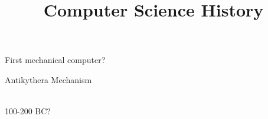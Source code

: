 \documentclass[xcolor={usenames,dvipsnames,svgnames,table},12pt]{beamer}
\title{Computer Science History}
\begin{document}

\begin{frame}
  \begin{center}
    First mechanical computer?
  \end{center}
\end{frame}

\begin{frame}{Antikythera Mechanism}
  \begin{center}
     \quad
     \\
    100-200 BC?
  \end{center}
\end{frame}
\end{document}
